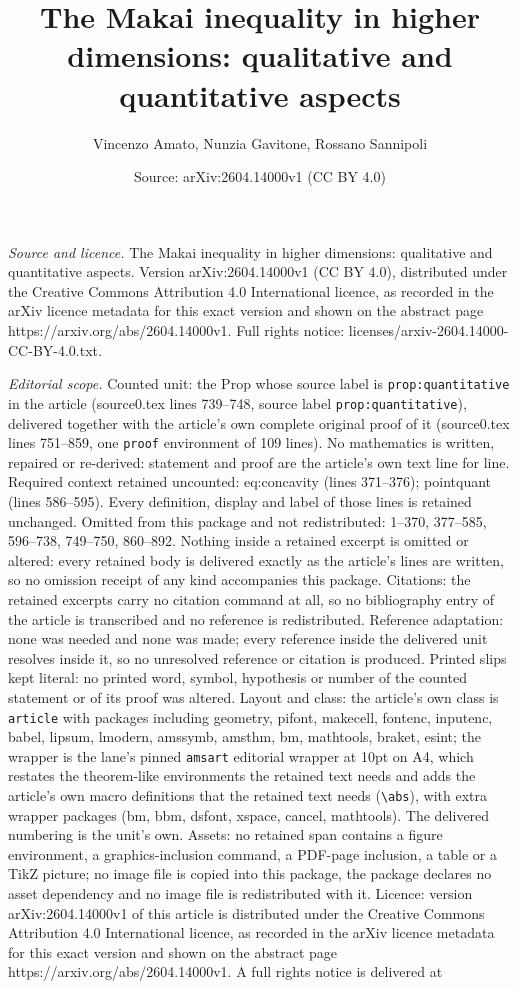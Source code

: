 \documentclass[10pt,a4paper]{amsart}
\title[The Makai inequality in higher dimensions: qualitative and q]{The Makai inequality in higher dimensions: qualitative and quantitative aspects}
\author{Vincenzo Amato, Nunzia Gavitone, Rossano Sannipoli}
\date{Source: arXiv:2604.14000v1 (CC BY 4.0)}
\begin{document}
\maketitle

\noindent\emph{Source and licence.} The Makai inequality in higher dimensions: qualitative and quantitative aspects. Version arXiv:2604.14000v1 (CC BY 4.0), distributed under the Creative Commons Attribution 4.0 International licence, as recorded in the arXiv licence metadata for this exact version and shown on the abstract page https://arxiv.org/abs/2604.14000v1. Full rights notice: licenses/arxiv-2604.14000-CC-BY-4.0.txt.\par\smallskip

\noindent\textit{Editorial scope.} Counted unit: the Prop whose source label is \texttt{prop:quantitative} in the article (source0.tex lines 739--748, source label \texttt{prop:quantitative}), delivered together with the article's own complete original proof of it (source0.tex lines 751--859, one \texttt{proof} environment of 109 lines). No mathematics is written, repaired or re-derived: statement and proof are the article's own text line for line. Required context retained uncounted: eq:concavity (lines 371--376); pointquant (lines 586--595). Every definition, display and label of those lines is retained unchanged. Omitted from this package and not redistributed: 1--370, 377--585, 596--738, 749--750, 860--892. Nothing inside a retained excerpt is omitted or altered: every retained body is delivered exactly as the article's lines are written, so no omission receipt of any kind accompanies this package. Citations: the retained excerpts carry no citation command at all, so no bibliography entry of the article is transcribed and no reference is redistributed. Reference adaptation: none was needed and none was made; every reference inside the delivered unit resolves inside it, so no unresolved reference or citation is produced. Printed slips kept literal: no printed word, symbol, hypothesis or number of the counted statement or of its proof was altered. Layout and class: the article's own class is \texttt{article} with packages including geometry, pifont, makecell, fontenc, inputenc, babel, lipsum, lmodern, amssymb, amsthm, bm, mathtools, braket, esint; the wrapper is the lane's pinned \texttt{amsart} editorial wrapper at 10pt on A4, which restates the theorem-like environments the retained text needs and adds the article's own macro definitions that the retained text needs (\texttt{\textbackslash abs}), with extra wrapper packages (bm, bbm, dsfont, xspace, cancel, mathtools). The delivered numbering is the unit's own. Assets: no retained span contains a figure environment, a graphics-inclusion command, a PDF-page inclusion, a table or a TikZ picture; no image file is copied into this package, the package declares no asset dependency and no image file is redistributed with it. Licence: version arXiv:2604.14000v1 of this article is distributed under the Creative Commons Attribution 4.0 International licence, as recorded in the arXiv licence metadata for this exact version and shown on the abstract page https://arxiv.org/abs/2604.14000v1. A full rights notice is delivered at 
\end{document}
